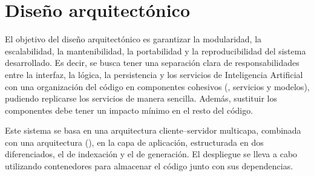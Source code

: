 \section{Diseño arquitectónico} \label{dis:arc}
El objetivo del diseño arquitectónico es garantizar la modularidad, la escalabilidad, la mantenibilidad, la portabilidad y la reproducibilidad del sistema desarrollado. Es decir, se busca tener una separación clara de responsabilidades entre la interfaz, la lógica, la persistencia y los servicios de Inteligencia Artificial con una organización del código en componentes cohesivos (, servicios y modelos), pudiendo replicarse los servicios de manera sencilla. Además, sustituir los componentes debe tener un impacto mínimo en el resto del código. 

Este sistema se basa en una arquitectura cliente–servidor multicapa, combinada con una arquitectura  (), en la capa de aplicación, estructurada en dos  diferenciados, el de indexación y el de generación. El despliegue se lleva a cabo utilizando contenedores  para almacenar el código junto con sus dependencias.

